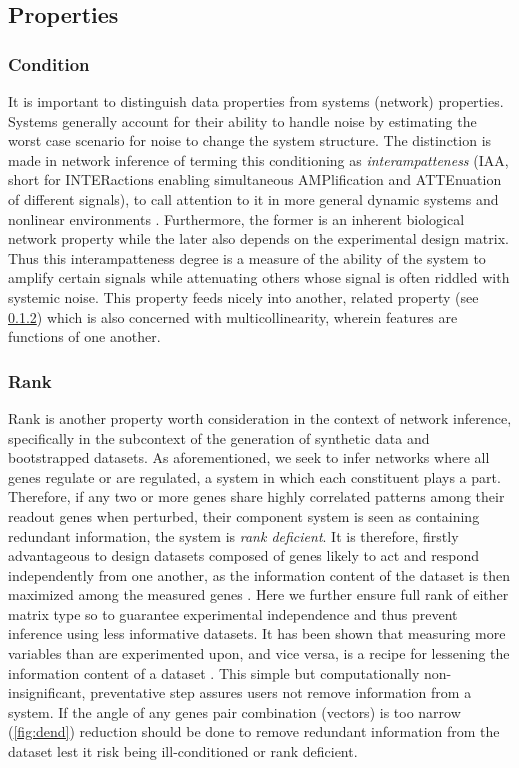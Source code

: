 \subsection{Properties}
\label{sec:prop}
\subsubsection{Condition}
\label{sec:cond}
It is important to distinguish data properties from systems (network) properties. Systems generally account for their ability to handle noise by estimating the worst case scenario for noise to change the system structure. The distinction is made in network inference of terming this conditioning as \emph{interampatteness} (IAA, short for INTERactions enabling simultaneous AMPlification and ATTEnuation of different signals), to call attention to it in more general dynamic systems and nonlinear environments \citep{nordling2009interampatteness}. Furthermore, the former is an inherent biological network property while the later also depends on the experimental design matrix.  Thus this interampatteness degree is a measure of the ability of the system to amplify certain signals while attenuating others whose signal is often riddled with systemic noise. This property feeds nicely into another, related property (see \cref{sec:rank}) which is also concerned with multicollinearity, wherein features are functions of one another.

\subsubsection{Rank}
\label{sec:rank}
Rank is another property worth consideration in the context of network inference, specifically in the subcontext of the generation of synthetic data and bootstrapped datasets. As aforementioned, we seek to infer networks where all genes regulate or are regulated, \ie a system in which each constituent plays a part. Therefore, if any two or more genes share highly correlated patterns among their readout genes when perturbed, their component system is seen as containing redundant information, \ie the system is \emph{rank deficient}. It is therefore, firstly advantageous to design datasets composed of genes likely to act and respond independently from one another, as the information content of the dataset is then maximized among the measured genes \citep{subramanian2017next}. Here we further ensure full rank of either matrix type so to guarantee experimental independence and thus prevent inference using less informative datasets. It has been shown that measuring more variables than are experimented upon, and vice versa, is a recipe for lessening the information content of a dataset \citep{Nordling2013}. This simple but computationally non-insignificant, preventative step assures users not remove information from a system.  If the angle of any genes pair combination (vectors) is too narrow (\cref{fig:dend}) reduction should be done to remove redundant information from the dataset lest it risk being ill-conditioned or rank deficient.

